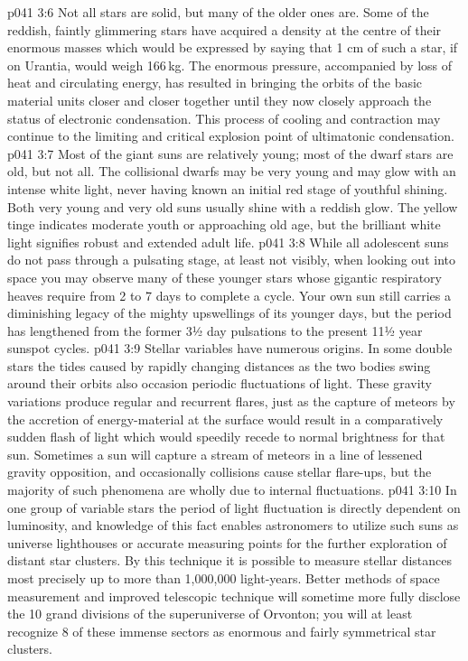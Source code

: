 \vs p041 3:6 \pc Not all stars are solid, but many of the older ones are. Some of the reddish, faintly glimmering stars have acquired a density at the centre of their enormous masses which would be expressed by saying that 1 cm of such a star, if on Urantia, would weigh 166\,kg. The enormous pressure, accompanied by loss of heat and circulating energy, has resulted in bringing the orbits of the basic material units closer and closer together until they now closely approach the status of electronic condensation. This process of cooling and contraction may continue to the limiting and critical explosion point of ultimatonic condensation.
\vs p041 3:7 Most of the giant suns are relatively young; most of the dwarf stars are old, but not all. The collisional dwarfs may be very young and may glow with an intense white light, never having known an initial red stage of youthful shining. Both very young and very old suns usually shine with a reddish glow. The yellow tinge indicates moderate youth or approaching old age, but the brilliant white light signifies robust and extended adult life.
\vs p041 3:8 \pc While all adolescent suns do not pass through a pulsating stage, at least not visibly, when looking out into space you may observe many of these younger stars whose gigantic respiratory heaves require from 2 to 7 days to complete a cycle. Your own sun still carries a diminishing legacy of the mighty upswellings of its younger days, but the period has lengthened from the former 3½ day pulsations to the present 11½ year sunspot cycles.
\vs p041 3:9 Stellar variables have numerous origins. In some double stars the tides caused by rapidly changing distances as the two bodies swing around their orbits also occasion periodic fluctuations of light. These gravity variations produce regular and recurrent flares, just as the capture of meteors by the accretion of energy\hyp{}material at the surface would result in a comparatively sudden flash of light which would speedily recede to normal brightness for that sun. Sometimes a sun will capture a stream of meteors in a line of lessened gravity opposition, and occasionally collisions cause stellar flare\hyp{}ups, but the majority of such phenomena are wholly due to internal fluctuations.
\vs p041 3:10 In one group of variable stars the period of light fluctuation is directly dependent on luminosity, and knowledge of this fact enables astronomers to utilize such suns as universe lighthouses or accurate measuring points for the further exploration of distant star clusters. By this technique it is possible to measure stellar distances most precisely up to more than 1,000,000 light\hyp{}years. Better methods of space measurement and improved telescopic technique will sometime more fully disclose the 10 grand divisions of the superuniverse of Orvonton; you will at least recognize 8 of these immense sectors as enormous and fairly symmetrical star clusters.

